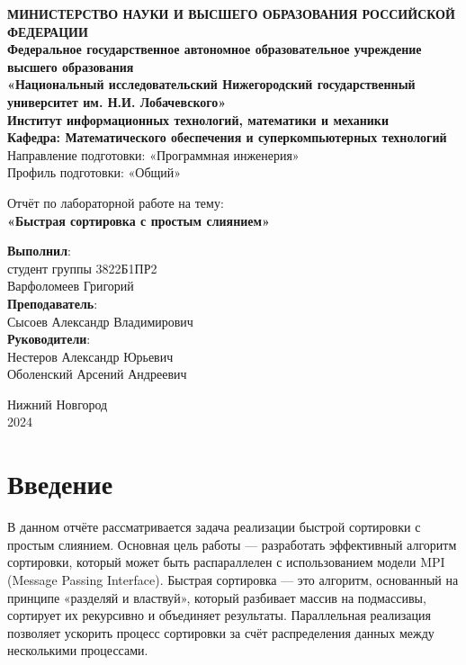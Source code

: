 \documentclass[a4paper,12pt]{article}
\begin{document}
\begin{titlepage}
\begin{center}
\textbf{МИНИСТЕРСТВО НАУКИ И ВЫСШЕГО ОБРАЗОВАНИЯ РОССИЙСКОЙ ФЕДЕРАЦИИ} \\
\textbf{Федеральное государственное автономное образовательное учреждение высшего образования} \\
\textbf{«Национальный исследовательский Нижегородский государственный университет им. Н.И. Лобачевского»} \\[1cm]
\textbf{Институт информационных технологий, математики и механики }\\[0.5cm]
\textbf{Кафедра: Математического обеспечения и суперкомпьютерных технологий}\\[0.5cm]
Направление подготовки: «Программная инженерия»\\
Профиль подготовки: «Общий»\\

\vfill

Отчёт по лабораторной работе на тему:\\
{\Large
\textbf{«Быстрая сортировка с простым слиянием»} \\
}
\vfill
\begin{flushright}
\textbf{Выполнил}:\\
студент группы 3822Б1ПР2 \\
Варфоломеев Григорий \\
\vspace{1cm}
\textbf{Преподаватель}: \\
Сысоев Александр Владимирович \\
\textbf{Руководители}: \\
Нестеров Александр Юрьевич\\
Оболенский Арсений Андреевич\\
\end{flushright}
\vfill
Нижний Новгород \\
2024
\end{center}
\end{titlepage}

\tableofcontents
\newpage

\section{Введение}
В данном отчёте рассматривается задача реализации быстрой сортировки с простым слиянием. Основная цель работы — разработать эффективный алгоритм сортировки, который может быть распараллелен с использованием модели MPI (Message Passing Interface). Быстрая сортировка — это алгоритм, основанный на принципе «разделяй и властвуй», который разбивает массив на подмассивы, сортирует их рекурсивно и объединяет результаты. Параллельная реализация позволяет ускорить процесс сортировки за счёт распределения данных между несколькими процессами.
\end{document}
